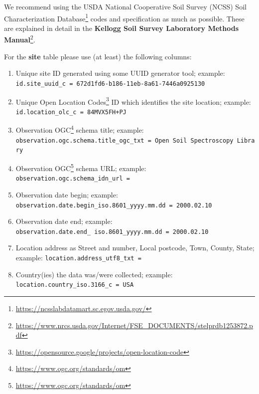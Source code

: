 \documentclass[
  graybox,natbib,nospthms]{svmono}
\providecommand{\tightlist}{%
  \setlength{\itemsep}{0pt}\setlength{\parskip}{0pt}}
\providecommand{\tightlist}{\setlength{\itemsep}{0pt}\setlength{\parskip}{0pt}}
\renewcommand{\href}[2]{#2 (\url{#1})}
\renewcommand{\href}[2]{#2\footnote{\url{#1}}}
\begin{document}
We recommend using the USDA \href{https://ncsslabdatamart.sc.egov.usda.gov/}{National Cooperative Soil Survey (NCSS) Soil
Characterization Database} codes and specification as much as possible. These are explained in detail in the \href{https://www.nrcs.usda.gov/Internet/FSE_DOCUMENTS/stelprdb1253872.pdf}{\textbf{Kellogg Soil Survey Laboratory Methods Manual}}.

For the \textbf{site} table please use (at least) the following columns:

\begin{enumerate}
\def\labelenumi{\arabic{enumi}.}
\tightlist
\item
  Unique site ID generated using some UUID generator tool; example: \texttt{id.site\_uuid\_c\ =\ \textquotesingle{}672d1fd6-b186-11eb-8a61-7446a0925130\textquotesingle{}}\\
\item
  Unique \href{https://opensource.google/projects/open-location-code}{Open Location Codes} ID which identifies the site location; example: \texttt{id.location\_olc\_c\ =\ \textquotesingle{}84MVX5FH+PJ\textquotesingle{}}\\
\item
  \href{https://www.ogc.org/standards/om}{Observation OGC} schema title; example: \texttt{observation.ogc.schema.title\_ogc\_txt\ =\ \textquotesingle{}Open\ Soil\ Spectroscopy\ Library\textquotesingle{}}\\
\item
  \href{https://www.ogc.org/standards/om}{Observation OGC} schema URL; example: \texttt{observation.ogc.schema\_idn\_url\ =\ \textquotesingle{}\textquotesingle{}}\\
\item
  Observation date begin; example: \texttt{observation.date.begin\_iso.8601\_yyyy.mm.dd\ =\ \textquotesingle{}2000.02.10\textquotesingle{}}\\
\item
  Observation date end; example: \texttt{observation.date.end\_\ iso.8601\_yyyy.mm.dd\ =\ \textquotesingle{}2000.02.10\textquotesingle{}}\\
\item
  Location address as Street and number, Local postcode, Town, County, State; example: \texttt{location.address\_utf8\_txt\ =\ \textquotesingle{}\textquotesingle{}}\\
\item
  Country(ies) the data was/were collected; example: \texttt{location.country\_iso.3166\_c\ =\ \textquotesingle{}USA\textquotesingle{}}\\

\end{enumerate}
\end{document}
